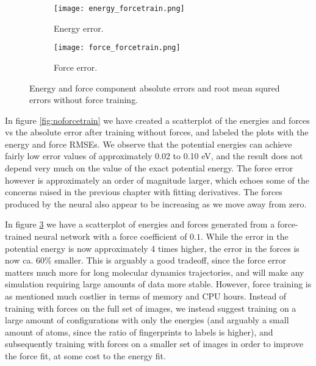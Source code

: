 \begin{figure}[H]
\begin{adjustbox}{max width=1.2\linewidth,center}
\centering
  \begin{subfigure}[b]{0.55\textwidth}
      \texttt{[image: energy\_forcetrain.png]}
      \caption{Energy error.}
    \label{fig:f1}
  \end{subfigure}
  \hfill
  \begin{subfigure}[b]{0.55\textwidth}
      \texttt{[image: force\_forcetrain.png]}
      \caption{Force error.}
    \label{fig:f2}
  \end{subfigure}
\end{adjustbox}
\caption{Energy and force component absolute errors and root mean squred
    errors without force training.}
    \label{fig:forcetrain}
\end{figure}

In figure \ref{fig:noforcetrain} we have created a scatterplot
of the energies and forces vs the absolute error after training without
forces, and labeled the plots with the energy and force RMSEs.
We observe that the potential energies can achieve fairly
low error values of approximately 0.02 to 0.10 eV, and the
result does not depend very much on the value of the exact potential
energy.
The force error however is approximately an order of magnitude
larger, which echoes some of the concerns raised in the previous
chapter with fitting derivatives. The forces produced by the neural
also appear to be increasing as we move away from zero.
\par
In figure \ref{fig:forcetrain} we have a scatterplot of energies
and forces generated from a force-trained neural network
with a force coefficient of $0.1$.
While the error in the potential energy is now approximately 4 times higher,
the error in the forces is now ca. $60 \%$ smaller.
This is arguably a good tradeoff, since the force error matters
much more for long molecular dynamics trajectories, and will make
any simulation requiring large amounts of data more stable.
However, force training is as mentioned much costlier in terms
of memory and CPU hours. Instead of training with forces on the full
set of images, we instead suggest training on a large amount of configurations
with only the energies (and arguably a small amount of atoms, since
the ratio of fingerprints to labels is higher), and subsequently training
with forces on a smaller set of images in order to improve the force fit,
at some cost to the energy fit.

